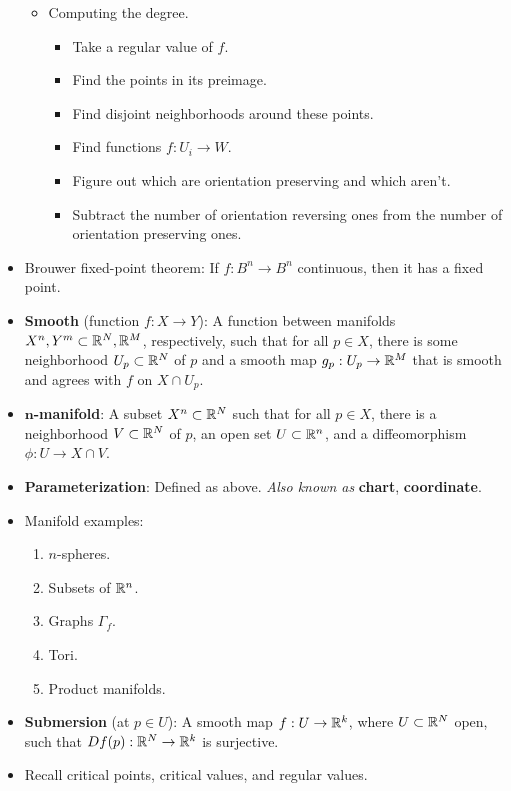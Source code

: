 \documentclass[../notes.tex]{subfiles}
\begin{document}
\begin{itemize}
\begin{itemize}
        \item Computing the degree.
        \begin{itemize}
            \item Take a regular value of $f$.
            \item Find the points in its preimage.
            \item Find disjoint neighborhoods around these points.
            \item Find functions $f:U_i\to W$.
            \item Figure out which are orientation preserving and which aren't.
            \item Subtract the number of orientation reversing ones from the number of orientation preserving ones.
        \end{itemize}
    \end{itemize}
    \item Brouwer fixed-point theorem: If $f:B^n\to B^n$ continuous, then it has a fixed point.
    \item \textbf{Smooth} (function $f:X\to Y$): A function between manifolds $X^n,Y^m\subset\mathbb{R}^N,\mathbb{R}^M$, respectively, such that for all $p\in X$, there is some neighborhood $U_p\subset\mathbb{R}^N$ of $p$ and a smooth map $g_p:U_p\to\mathbb{R}^M$ that is smooth and agrees with $f$ on $X\cap U_p$.
    \item \textbf{$\bm{n}$-manifold}: A subset $X^n\subset\mathbb{R}^N$ such that for all $p\in X$, there is a neighborhood $V\subset\mathbb{R}^N$ of $p$, an open set $U\subset\mathbb{R}^n$, and a diffeomorphism $\phi:U\to X\cap V$.
    \item \textbf{Parameterization}: Defined as above. \emph{Also known as} \textbf{chart}, \textbf{coordinate}.
    \item Manifold examples:
    \begin{enumerate}
        \item $n$-spheres.
        \item Subsets of $\mathbb{R}^n$.
        \item Graphs $\Gamma_f$.
        \item Tori.
        \item Product manifolds.
    \end{enumerate}
    \item \textbf{Submersion} (at $p\in U$): A smooth map $f:U\to\mathbb{R}^k$, where $U\subset\mathbb{R}^N$ open, such that $Df(p):\mathbb{R}^N\to\mathbb{R}^k$ is surjective.
    \item Recall critical points, critical values, and regular values.

\end{itemize}
\end{document}
